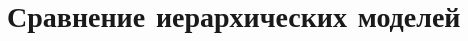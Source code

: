 \documentclass[12pt,a4paper, oneside]{extreport}
\begin{document}
\begin{figure}[H]
	\begin{minipage}[H]{0.4\linewidth}
\end{minipage}
\end{figure}
\newpage



\chapter[Сравнение иерархических моделей]{Сравнение иерархических моделей}\label{app-b}
\end{document}
